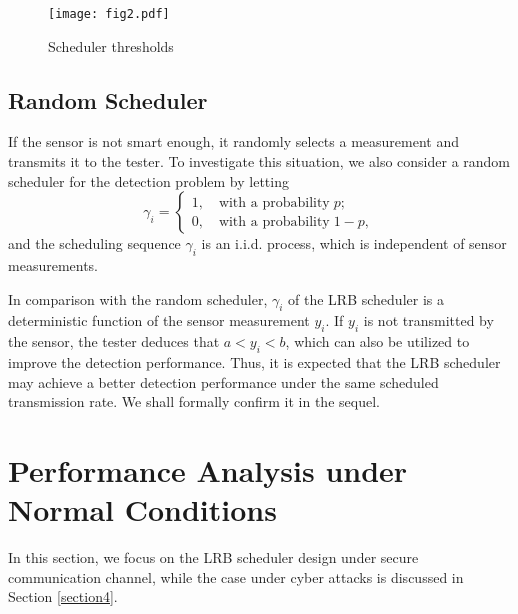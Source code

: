 \documentclass[journal]{IEEEtran}
\begin{document}
\begin{figure}[htbp!]
  \centering
  \texttt{[image: fig2.pdf]}
    \caption{Scheduler thresholds}
  \label{fig2}
\end{figure}

\subsection{Random Scheduler}
If the sensor is not smart enough, it randomly selects a measurement and transmits it to the tester. To investigate this situation, we also consider a random scheduler for the detection problem by letting
\begin{equation}\label{randomscheduler}
{\gamma _i} = \left\{ \begin{array}{l}
1,{\quad\text{with~a~probability}}\;{p;}\\
0,{\quad\text{with~a~probability}} \;1 - {p},
\end{array} \right.
\end{equation}
and the scheduling sequence $\gamma_i$ is an i.i.d. process, which is independent of sensor measurements.

 In comparison with the random scheduler, $\gamma_i$ of the LRB scheduler is a deterministic function of the sensor measurement $y_i$.  If $y_i$ is not transmitted by the sensor, the tester deduces that $a<y_i<b$, which can also be utilized to improve the detection performance. Thus, it is expected that the LRB scheduler may achieve a better detection performance under the same scheduled transmission rate. We shall formally confirm it in the sequel.


\section{Performance Analysis under Normal Conditions}
\label{sec_npt}

In this section, we focus on the LRB scheduler design under secure communication channel, while the case under cyber attacks  is discussed in Section \ref{section4}.
\end{document}
